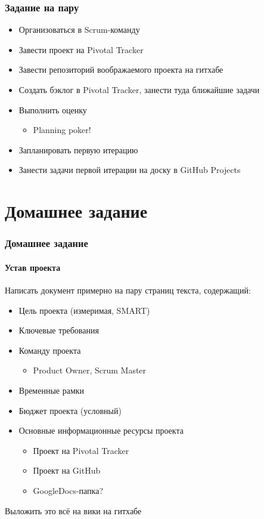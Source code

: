 \documentclass[xetex,mathserif,serif]{beamer}
\begin{document}
	\begin{frame}
		\frametitle{Задание на пару}
		\begin{itemize}
			\item Организоваться в Scrum-команду
			\item Завести проект на Pivotal Tracker
			\item Завести репозиторий воображаемого проекта на гитхабе
			\item Создать бэклог в Pivotal Tracker, занести туда ближайшие задачи
			\item Выполнить оценку
			\begin{itemize}
				\item Planning poker!
			\end{itemize}
			\item Запланировать первую итерацию
			\item Занести задачи первой итерации на доску в GitHub Projects
		\end{itemize}
	\end{frame}

	\section{Домашнее задание}
	
	\begin{frame}
		\frametitle{Домашнее задание}
		\framesubtitle{Устав проекта}
		Написать документ примерно на пару страниц текста, содержащий:
		\begin{itemize}
			\item Цель проекта (измеримая, SMART)
			\item Ключевые требования
			\item Команду проекта
			\begin{itemize}
				\item Product Owner, Scrum Master
			\end{itemize}
			\item Временные рамки
			\item Бюджет проекта (условный)
			\item Основные информационные ресурсы проекта
			\begin{itemize}
				\item Проект на Pivotal Tracker
				\item Проект на GitHub
				\item GoogleDocs-папка?
			\end{itemize}
		\end{itemize}
		Выложить это всё на вики на гитхабе
	\end{frame}
\end{document}
